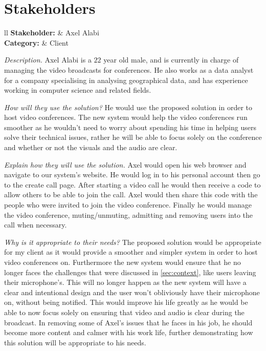 \section{Stakeholders}
\label{sec:stakeholders}

\begin{tblr}{ll}
  \textsf{\bfseries Stakeholder: } & Axel Alabi\\
  \textsf{\bfseries Category: } & Client\\
\end{tblr}
\vspace{0.2cm}

\textit{Description.} %
Axel Alabi is a $22$ year old male, and is currently in charge 
of managing the video broadcasts for conferences. He also
works as a data analyst for a company specialising in analysing
geographical data, and has experience working in computer 
science and related fields. \vspace{0.2cm}

\textit{How will they use the solution?} %
He would use the proposed solution in order to host
video conferences. The new system would help the 
video conferences run smoother as he wouldn't need to worry 
about spending his time in helping users solve their technical
issues, rather he will be able to focus solely on the
conference and whether or not the visuals and the audio are
clear. \vspace{0.2cm}

\textit{Explain how they will use the solution.}
Axel would open his web browser and navigate to our system's
website. He would log in to his personal account then go to
the create call page. After starting a video call he would 
then receive a code to allow others to be able to join the
call. Axel would then share this code with the people who
were invited to join the video conference. Finally he would 
manage the video conference, muting/unmuting, admitting 
and removing users into the call when necessary.
\vspace{0.2cm}

\textit{Why is it appropriate to their needs?} %
The proposed solution would be appropriate for my client as it
would provide a smoother and simpler system in order to host 
video conferences on. Furthermore the new system would ensure
that he no longer faces the challenges that were discussed
in \ref{sec:context}, like users leaving their microphone's.
This will no longer happen as the new system will have a 
clear and intentional design and the user won't obliviously 
have their microphone on, without being notified. This would 
improve his life greatly as he would be able to now focus 
solely on ensuring that video and audio is clear during the 
broadcast. In removing some of Axel's issues that he faces in
his job, he should become more content and calmer with his
work life, further demonstrating how this solution will be 
appropriate to his needs.
\vspace{0.2cm}

